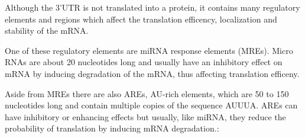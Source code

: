 Although the 3'UTR is not translated into a protein, it contains many regulatory elements and regions which affect the translation efficency, localization and stability of the mRNA. 

One of these regulatory elements are miRNA response elements (MREs). Micro RNAs are about 20 nucleotides long and usually have an inhibitory effect on mRNA by inducing degradation of the mRNA, thus affecting translation efficeny. 

Aside from MREs there are also AREs, AU-rich elements, which are 50 to 150 nucleotides long and contain multiple copies of the sequence AUUUA. AREs can have inhibitory or enhancing effects but usually, like miRNA, they reduce the probability of translation by inducing mRNA degradation.:
